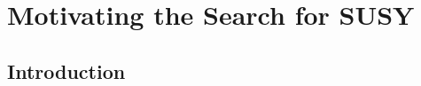 
\setcounter{secnumdepth}{3}
\setcounter{tocdepth}{3}

\setlength{\parindent}{1 em}


\makeatother


\chapter{Motivating the Search for SUSY}


\section{Introduction}

